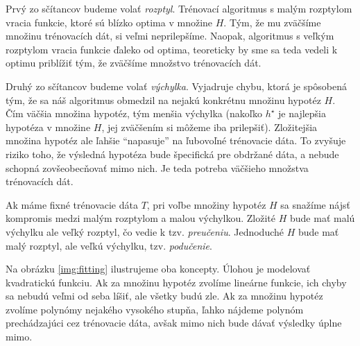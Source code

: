 Prvý zo sčítancov budeme volať \emph{rozptyl}. Trénovací algoritmus
s malým rozptylom vracia funkcie, ktoré sú blízko optima v množine $H$.
Tým, že mu zväčšíme množinu trénovacích dát, si veľmi neprilepšíme.
Naopak, algoritmus s veľkým rozptylom vracia funkcie ďaleko od optima,
teoreticky by sme sa teda vedeli k optimu priblížiť tým, že zväčšíme
množstvo trénovacích dát.

\medskip

Druhý zo sčítancov budeme volať \emph{výchylka}. Vyjadruje chybu, ktorá
je spôsobená tým, že sa náš algoritmus obmedzil na nejakú konkrétnu
množinu hypotéz $H$. Čím väčšia množina hypotéz, tým menšia výchylka
(nakoľko $h^\star$ je najlepšia hypotéza v množine $H$, jej zväčšením
si môžeme iba prilepšiť). Zložitejšia množina hypotéz ale ľahšie
``napasuje'' na ľubovoľné trénovacie dáta. To zvyšuje riziko toho,
že výsledná hypotéza bude špecifická pre obdržané dáta, a nebude
schopná zovšeobecňovať mimo nich. Je teda potreba väčšieho množstva
trénovacích dát.

\medskip

Ak máme fixné trénovacie dáta $T$, pri voľbe množiny hypotéz $H$ sa snažíme
nájsť kompromis medzi malým rozptylom a malou výchylkou. Zložité $H$
bude mať malú výchylku ale veľký rozptyl, čo vedie k tzv. \emph{preučeniu}.
Jednoduché $H$ bude mať malý rozptyl, ale veľkú výchylku, tzv. \emph{podučenie}.

Na obrázku \ref{img:fitting} ilustrujeme oba koncepty. Úlohou je modelovať
kvadratickú funkciu. Ak za množinu hypotéz zvolíme lineárne funkcie,
ich chyby sa nebudú veľmi od seba líšiť, ale všetky budú zle. Ak za
množinu hypotéz zvolíme polynómy nejakého vysokého stupňa, ľahko
nájdeme polynóm prechádzajúci cez trénovacie dáta, avšak mimo nich
bude dávať výsledky úplne mimo.

